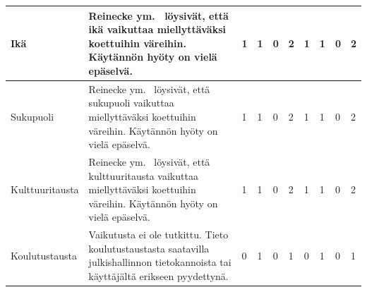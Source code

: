 \documentclass[finnish, 12pt, a4paper, elec, utf8, a-1b, online]{aaltothesis}
\begin{document}
{\begin{longtable}{p{2.5cm}|p{6cm}|p{0.5cm}p{0.5cm}p{0.5cm}|p{0.5cm}|p{0.5cm}p{0.5cm}p{0.5cm}|p{0.5cm}|}
        \midrule
        Ikä                                    & Reinecke ym.~\cite{10.1145/2556288.2557052} löysivät, että ikä vaikuttaa miellyttäväksi koettuihin väreihin. Käytännön hyöty on vielä epäselvä.                                                                                                                                                                          & 1                                          & 1                                   & 0                                      & 2                            & 1                                               & 1                                         & 0                                         & 2                            \\
        \midrule
        Sukupuoli                              & Reinecke ym.~\cite{10.1145/2556288.2557052} löysivät, että sukupuoli vaikuttaa miellyttäväksi koettuihin väreihin. Käytännön hyöty on vielä epäselvä.                                                                                                                                                                    & 1                                          & 1                                   & 0                                      & 2                            & 1                                               & 1                                         & 0                                         & 2                            \\
        \midrule
        Kulttuuritausta                        & Reinecke ym.~\cite{10.1145/2556288.2557052} löysivät, että kulttuuritausta vaikuttaa miellyttäväksi koettuihin väreihin. Käytännön hyöty on vielä epäselvä.                                                                                                                                                              & 1                                          & 1                                   & 0                                      & 2                            & 1                                               & 1                                         & 0                                         & 2                            \\
        \midrule
        Koulutustausta                         & Vaikutusta ei ole tutkittu. Tieto koulutustaustasta saatavilla julkishallinnon tietokannoista tai käyttäjältä erikseen pyydettynä.                                                                                                                                                                                       & 0                                          & 1                                   & 0                                      & 1                            & 0                                               & 1                                         & 0                                         & 1                            \\

\end{longtable}}
\end{document}
